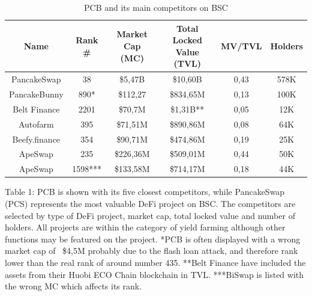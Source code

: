 \documentclass[12pt]{article}
\begin{document}
\begin{table}[ht]
\caption{PCB and its main competitors on BSC}
\begin{tabular}{||c c c c c c||} 
 \hline
 Name & Rank \# &  Market Cap (MC) & Total Locked Value (TVL) & MV/TVL & Holders \\ [0.5ex] 
 \hline\hline
 PancakeSwap & 38 & \$5,47B & \$10,60B & 0,43 & 578K \\ 
 \hline
 PancakeBunny & 890* & \$112,27 & \$834,65M & 0,13 & 100K \\
 \hline
 Belt Finance & 2201 & \$70,7M & \$1,31B** & 0,05 & 12K \\
 \hline
 Autofarm & 395 & \$71,51M & \$890,86M & 0,08 & 64K\\
 \hline
 Beefy.finance & 354 & \$90,71M & \$474,86M & 0,19 & 25K\\ 
 \hline
  ApeSwap & 235 & \$226,36M & \$509,01M & 0,44 & 50K\\ 
 \hline
  ApeSwap & 1598*** & \$133,58M & \$714,17M & 0,18 & 44K\\ [1ex] 
 \hline
\end{tabular}
\label{Table 1}

Table 1: PCB is shown with its five closest competitors, while PancakeSwap (PCS) represents the most valuable DeFi project on BSC. The competitors are selected by type of DeFi project, market cap, total locked value and number of holders. All projects are within the category of yield farming although other functions may be featured on the project. *PCB is often displayed with a wrong market cap of ~\$4,5M probably due to the flash loan attack, and therefore rank lower than the real rank of around number 435. **Belt Finance have included the assets from their Huobi ECO Chain blockchain in TVL. ***BiSwap is listed with the wrong MC which affects its rank.
\end{table}
\end{document}
